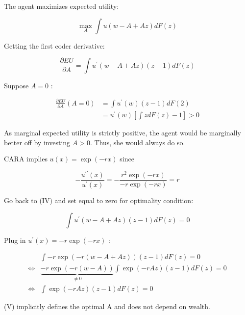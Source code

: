 {{\begin{enumerate}[label=(\alph*)]
{\item 
The agent maximizes expected utility:

$$
\max _{A} \int u\left(w-A+Az\right) d F(z)
$$

Getting the first coder derivative:

\begin{equation*}
\frac{\partial E U}{\partial A}=\int u^{\prime}(w-A+A z)(z-1) d F(z) \tag{IV}
\end{equation*}

Suppose $A=0$ :

$$
\begin{aligned}
\frac{\partial E U}{\partial A}(A=0) & =\int u^{\prime}(w)(z-1) d F(2) \\
& =u^{\prime}(w)\left[\int z d F(z)-1\right]>0
\end{aligned}
$$

As marginal expected utility is strictly positive, the agent would be marginally better off by investing $A>0$. Thus, she would always do so.
}
{\item 
CARA implies $u(x)=\exp (-r x)$ since

$$
-\frac{u^{\prime \prime}(x)}{u^{\prime}(x)}=-\frac{r^{2} \exp (-r x)}{-r \exp (-r x)}=r
$$

Go back to (IV) and set equal to zero for optimality condition:

$$
\int u^{\prime}(w-A+A z)(z-1) d F(z)=0
$$

Plug in $u^{\prime}(x)=-r \exp (-r x)$ :

\begin{align*}
& \int-r \exp (-r(w-A+A z))(z-1) d F(z)=0 \\
\Leftrightarrow & \underbrace{-r \exp (-r(w-A))}_{\neq 0} \int \exp \left(-r Az\right)(z-1) d F(z)=0 \\
\Leftrightarrow & \int \exp \left(-r Az\right)(z-1) d F(z)=0 \tag{V}
\end{align*}

(V) implicitly defines the optimal A and does not depend on wealth.
}
\end{enumerate}
}
}

